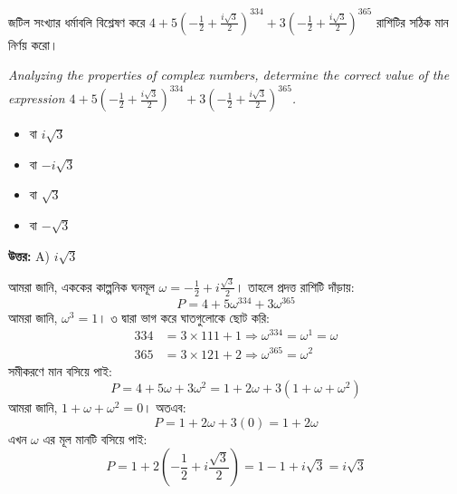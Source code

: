 \documentclass[12pt, a4paper]{article}
\begin{document}
\begin{tcolorbox}[questionbox={প্রশ্ন (Question) 23}]
    \noindent
    জটিল সংখ্যার ধর্মাবলি বিশ্লেষণ করে $4 + 5\left(-\frac{1}{2} + \frac{i\sqrt{3}}{2}\right)^{334} + 3\left(-\frac{1}{2} + \frac{i\sqrt{3}}{2}\right)^{365}$ রাশিটির সঠিক মান নির্ণয় করো।
    
    \vspace{0.8em}
    \begin{english}
    \noindent\textit{\color{darkgray}
    Analyzing the properties of complex numbers, determine the correct value of the expression $4 + 5\left(-\frac{1}{2} + \frac{i\sqrt{3}}{2}\right)^{334} + 3\left(-\frac{1}{2} + \frac{i\sqrt{3}}{2}\right)^{365}$.
    }
    \end{english}
\end{tcolorbox}

\begin{itemize}[label={}, leftmargin=1cm, itemsep=0.5em]
    \item[\textbf{A)}] বা $i\sqrt{3}$
    \item[\textbf{B)}] বা $-i\sqrt{3}$
    \item[\textbf{C)}] বা $\sqrt{3}$
    \item[\textbf{D)}] বা $-\sqrt{3}$
\end{itemize}

\vspace{0.5em}
\begin{tcolorbox}[answerbox]
    \textbf{\color{success} উত্তর:} A) $i\sqrt{3}$
\end{tcolorbox}
\vspace{1em}

\begin{tcolorbox}[solutionbox={সমাধান (Solution)}]
    \noindent
    আমরা জানি, এককের কাল্পনিক ঘনমূল $\omega = -\frac{1}{2} + i\frac{\sqrt{3}}{2}$। তাহলে প্রদত্ত রাশিটি দাঁড়ায়:
    \[ P = 4 + 5\omega^{334} + 3\omega^{365} \]
    আমরা জানি, $\omega^3 = 1$। ৩ দ্বারা ভাগ করে ঘাতগুলোকে ছোট করি:
    \begin{align*}
        334 &= 3 \times 111 + 1 \Rightarrow \omega^{334} = \omega^1 = \omega \\
        365 &= 3 \times 121 + 2 \Rightarrow \omega^{365} = \omega^2
    \end{align*}
    সমীকরণে মান বসিয়ে পাই:
    \[ P = 4 + 5\omega + 3\omega^2 = 1 + 2\omega + 3(1 + \omega + \omega^2) \]
    আমরা জানি, $1 + \omega + \omega^2 = 0$। অতএব:
    \[ P = 1 + 2\omega + 3(0) = 1 + 2\omega \]
    এখন $\omega$ এর মূল মানটি বসিয়ে পাই:
    \[ P = 1 + 2\left(-\frac{1}{2} + i\frac{\sqrt{3}}{2}\right) = 1 - 1 + i\sqrt{3} = i\sqrt{3} \]
\end{tcolorbox}
\end{document}
